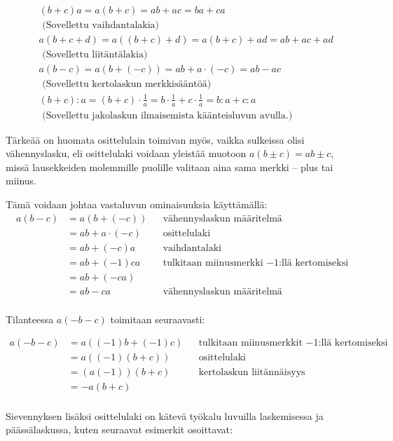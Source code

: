 \begin{esimerkki}
\begin{align*}
&(b+c)a = a(b+c) = ab+ac = ba+ca \\
&\text{ (Sovellettu vaihdantalakia)} \\
&a(b+c+d) = a((b+c)+d) = a(b+c)+ad = ab+ac+ad \\
&\text{ (Sovellettu liitäntälakia)} \\
&a(b-c) = a(b+(-c))=ab+a\cdot(-c)=ab-ac \\
&\text{ (Sovellettu kertolaskun merkkisääntöä)} \\
&(b+c):a = (b+c)\cdot\frac1a = b\cdot\frac1a+c\cdot\frac1a = b:a+c:a \\
&\text{ (Sovellettu jakolaskun ilmaisemista käänteisluvun avulla.) }
\end{align*}
\end{esimerkki}

Tärkeää on huomata osittelulain toimivan myös, vaikka sulkeissa olisi vähennyslasku, eli osittelulaki voidaan yleistää muotoon $a(b\pm c)=ab \pm c$, missä lausekkeiden molemmille puolille valitaan aina sama merkki -- plus tai miinus.

Tämä voidaan johtaa vastaluvun ominaisuuksia käyttämällä:
\begin{align*}
	a(b-c)
	&=a(b+(-c)) && \text{vähennyslaskun määritelmä} \\
	&=ab+a\cdot (-c) && \text{osittelulaki} \\
	&=ab+ (-c)a && \text{vaihdantalaki} \\
	&=ab+ (-1)ca && \text{tulkitaan miinusmerkki $-1$:llä kertomiseksi} \\
	&=ab+ (-ca)&& \text{} \\
	&=ab-ca && \text{vähennyslaskun määritelmä} \\
	\end{align*}	
	
Tilanteessa $a(-b-c)$ toimitaan seuraavasti:

\begin{align*}
	a(-b-c)
	&=a((-1)b+(-1)c) && \text{tulkitaan miinusmerkkit $-1$:llä kertomiseksi} \\
	&=a((-1)(b+c)) && \text{osittelulaki} \\
	&=(a(-1))(b+c) && \text{kertolaskun liitännäisyys} \\
	&=-a(b+c) && \text{} \\
	\end{align*}	

Sievennyksen lisäksi osittelulaki on kätevä työkalu luvuilla laskemisessa ja päässälaskussa, kuten seuraavat esimerkit osoittavat:

